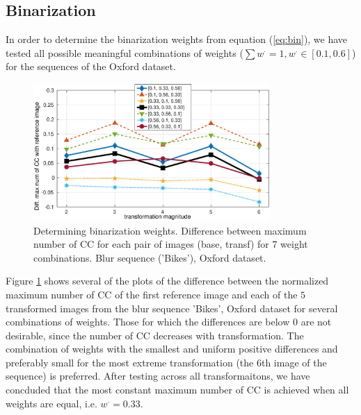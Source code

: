 \documentclass[conference,compsoc]{IEEEtran}
\begin{document}
\subsection{Binarization}
In order to determine the binarization weights from equation (\ref{eq:bin}), we have tested all possible meaningful combinations of weights ($\sum w^{\cdot} =1, w^{\cdot} \in [0.1,0.6] $) for the sequences of the Oxford dataset.
\begin{figure}[htb]
\centering
\begin{minipage}[b]{.99\linewidth}
  \centering
  \centerline{\includegraphics[width=9cm]{diff_num_cc_bin}}
\end{minipage}
\hfill
\caption{Determining binarization weights. Difference between maximum number of CC for each pair of images (base, transf) for 7 weight combinations. Blur sequence ('Bikes'), Oxford dataset.}
\label{fig:bin_bikes}
%
\end{figure}

Figure \ref{fig:bin_bikes} shows several of the plots of the difference between the normalized maximum number of CC of the first reference image and each of the $5$ transformed images from the blur sequence 'Bikes', Oxford dataset for several combinations of weights. Those for which the differences are below $0$ are not desirable, since the number of CC decreases with transformation. The combination of weights with the smallest and uniform positive differences and preferably small for the most extreme transformation (the $6$th image of the sequence) is preferred. After testing across all transformaitons, we have concduded that the most constant maximum number of CC is achieved when all weights are equal, i.e.  $w^{\cdot}=0.33$. 

\end{document}
